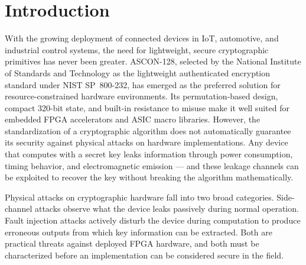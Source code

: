 \documentclass[conference]{IEEEtran}
\begin{document}
\section{Introduction}

With the growing deployment of connected devices in IoT,
automotive, and industrial control systems, the need for
lightweight, secure cryptographic primitives has never been
greater. ASCON-128, selected by the National Institute of
Standards and Technology as the lightweight authenticated
encryption standard under NIST SP~800-232, has emerged as the
preferred solution for resource-constrained hardware
environments. Its permutation-based design, compact 320-bit
state, and built-in resistance to misuse make it well suited
for embedded FPGA accelerators and ASIC macro libraries.
However, the standardization of a cryptographic algorithm does
not automatically guarantee its security against physical
attacks on hardware implementations. Any device that computes
with a secret key leaks information through power consumption,
timing behavior, and electromagnetic emission — and these
leakage channels can be exploited to recover the key without
breaking the algorithm mathematically.

Physical attacks on cryptographic hardware fall into two broad
categories. Side-channel attacks observe what the device leaks
passively during normal operation. Fault injection attacks
actively disturb the device during computation to produce
erroneous outputs from which key information can be extracted.
Both are practical threats against deployed FPGA hardware, and
both must be characterized before an implementation can be
considered secure in the field.
\end{document}

